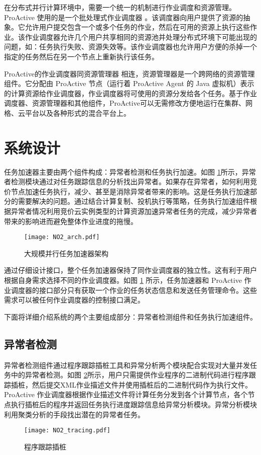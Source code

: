 在分布式并行计算环境中，需要一个统一的机制进行作业调度和资源管理。ProActive 使用的是一个批处理式作业调度器 \cite{pascheduling}。该调度器向用户提供了资源的抽象。它允许用户提交包含一个或多个任务的作业，然后在可用的资源上执行这些作业。该作业调度器允许几个用户共享相同的资源池并处理分布式环境下可能出现的问题，如：任务执行失败、资源失效等。该作业调度器也允许用户方便的杀掉一个指定的任务然后在另一个节点上重新执行该任务。

ProActive的作业调度器同资源管理器 \cite{parm} 相连，资源管理器是一个跨网络的资源管理组件。它分配由 ProActive 节点（运行着 ProActive Agent 的 Java 虚拟机）表示的计算资源给作业调度器，作业调度器将可使用的资源分发给各个任务。基于作业调度器、资源管理器和其他组件，ProActive可以无需修改方便地运行在集群、网格、云平台以及各种形式的混合平台上。

\section{系统设计}
\label{sec:no2}
任务加速器主要由两个组件构成：异常者检测和任务执行加速。如图 \ref{figure:no2arch}所示，异常者检测模块通过对任务跟踪信息的分析找出异常者。如果存在异常者，如何利用竞价节点加速任务执行，减少、甚至是消除异常者带来的影响。这是任务执行加速部分的需要解决的问题。通过结合计算复制、投机执行等策略，任务执行加速组件根据异常者情况利用竞价云实例类型的计算资源加速异常者任务的完成，减少异常者带来的影响进而避免整体作业进度的拖慢。
\begin{figure}
  \centering
  \texttt{[image: NO2\_arch.pdf]}
  \caption{大规模并行任务加速器架构}
  \label{figure:no2arch}
\end{figure}

通过仔细设计接口，整个任务加速器保持了同作业调度器的独立性。这有利于用户根据自身需求选择不同的作业调度器。如图 \ref{figure:no2arch} 所示，任务加速器和 ProActive 作业调度器的接口部分只有获取一个作业的任务状态信息和发送任务管理命令。这些需求可以被任何作业调度器的控制接口满足。

下面将详细介绍系统的两个主要组成部分：异常者检测组件和任务执行加速组件。

\subsection{异常者检测}
\label{subsec:no2_trace}
异常者检测组件通过程序跟踪插桩工具和异常分析两个模块配合实现对大量并发任务中的异常者检测。如图 \ref{figure:tracing}所示，用户只需提供作业程序的二进制代码进行程序跟踪插桩，然后提交XML作业描述文件并使用插桩后的二进制代码作为执行文件。ProActive 作业调度器根据作业描述文件将计算任务分发到各个计算节点，各个节点执行插桩后的程序并返回任务执行进度跟踪信息给异常分析模块。异常分析模块利用聚类分析的手段找出潜在的异常者任务。
\begin{figure}
  \centering
  \texttt{[image: NO2\_tracing.pdf]}
  \caption{程序跟踪插桩}
  \label{figure:tracing}
\end{figure}

